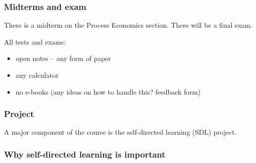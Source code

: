 \begin{frame}\frametitle{Midterms and exam}
	
	There is a midterm on the Process Economics section.
	\vspace{12pt}
	There will be a final exam.
	\vspace{24pt}
	
	All tests and exams:
	\begin{itemize}
		\item	open notes -- any form of paper
		\item	any calculator
		\item	no e-books (any ideas on how to handle this? feedback form)
	\end{itemize}	
\end{frame}

\begin{frame}\frametitle{Project}
	A major component of the course is the self-directed learning (SDL) project.
\end{frame}

\begin{frame}\frametitle{Why self-directed learning is important}
	
\end{frame}

